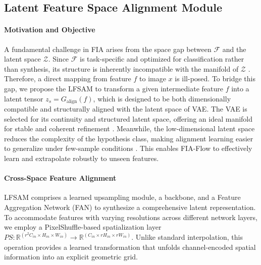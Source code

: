 \subsection{Latent Feature Space Alignment Module}
\paragraph{Motivation and Objective} 
A fundamental challenge in FIA arises from the space gap between $\mathcal{F}$ and the latent space $\mathcal{Z}$. 
Since $\mathcal{F}$ is task-specific and optimized for classification rather than synthesis, its structure is inherently incompatible with the manifold of $\mathcal{Z}$ \cite{yosinski2014transferable}.
Therefore, a direct mapping from feature $f$ to image $x$ is ill-posed.
To bridge this gap, we propose the LFSAM to transform a given intermediate feature $f$ into a latent tensor $z_s=G_{\text{align}}(f)$, which is designed to be both dimensionally compatible and structurally aligned with the latent space of VAE. 
The VAE is selected for its continuity and structured latent space, offering an ideal manifold for stable and coherent refinement \cite{doersch2016tutorial}. 
Meanwhile, the low-dimensional latent space reduces the complexity of the hypothesis class, making alignment learning easier to generalize under few-sample conditions \cite{yang2024few}. 
This enables FIA-Flow to effectively learn and extrapolate robustly to unseen features.


\paragraph{Cross-Space Feature Alignment}  
LFSAM comprises a learned upsampling module, a backbone, and a Feature Aggregation Network (FAN) to synthesize a comprehensive latent representation. 
To accommodate features with varying resolutions across different network layers, we employ a PixelShuffle-based spatialization layer $PS: \mathbb{R}^{(r^2  C_{in}\times  H_{in} \times W_{in})} \to \mathbb{R}^{(C_{in} \times r  H_{in} \times r W_{in})}$. 
Unlike standard interpolation, this operation provides a learned transformation that unfolds channel-encoded spatial information into an explicit geometric grid. 

